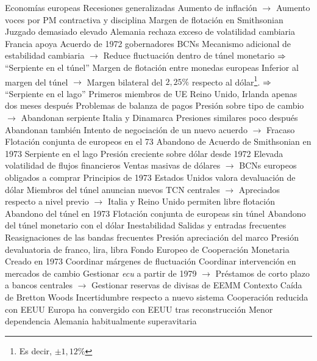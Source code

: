 \documentclass{nuevotema}
\begin{document}
\begin{esquemal}
				\4 Economías europeas
				\4[] Recesiones generalizadas
				\4[] Aumento de inflación
				\4[] $\to$ Aumento voces por PM contractiva y disciplina
				\4 Margen de flotación en Smithsonian
				\4[] Juzgado demasiado elevado
				\4[] Alemania rechaza exceso de volatilidad cambiaria
				\4[] Francia apoya
				\4 Acuerdo de 1972 gobernadores BCNs
				\4[] Mecanismo adicional de estabilidad cambiaria
				\4[] $\to$ Reduce fluctuación dentro de túnel monetario
				\4[] $\then$ ``Serpiente en el túnel''
				\4[] Margen de flotación entre monedas europeas
				\4[] Inferior al margen del túnel
				\4[] $\to$ Margen bilateral del $2,25\%$ respecto al dólar\footnote{Es decir, $\pm 1,12\%$}.
				\4[] $\then$ ``Serpiente en el lago''
				\4[] Primeros miembros de UE
				\4 Reino Unido, Irlanda apenas dos meses después
				\4[] Problemas de balanza de pagos
				\4[] Presión sobre tipo de cambio
				\4[] $\to$ Abandonan serpiente
				\4 Italia y Dinamarca
				\4[] Presiones similares poco después
				\4[] Abandonan también
				\4 Intento de negociación de un nuevo acuerdo
				\4[] $\to$ Fracaso
				\4 Flotación conjunta de europeos en el 73
				\4[$\then$] Abandono de Acuerdo de Smithsonian en 1973
			\3 Serpiente en el lago
				\4 Presión creciente sobre dólar desde 1972
				\4[] Elevada volatilidad de flujos financieros
				\4[] Ventas masivas de dólares
				\4[] $\to$ BCNs europeos obligados a comprar
				\4 Principios de 1973
				\4[] Estados Unidos valora devaluación de dólar
				\4[] Miembros del túnel anuncian nuevos TCN centrales
				\4[] $\to$ Apreciados respecto a nivel previo
				\4[] $\to$ Italia y Reino Unido permiten libre flotación
				\4 Abandono del túnel en 1973
				\4[] Flotación conjunta de europeas sin túnel
				\4[] Abandono del túnel monetario con el dólar
				\4 Inestabilidad
				\4[] Salidas y entradas frecuentes
				\4 Reasignaciones de las bandas frecuentes
				\4[] Presión apreciación del marco
				\4[] Presión devaluatoria de franco, lira, libra
				\4 Fondo Europeo de Cooperación Monetaria
				\4[] Creado en 1973
				\4[] Coordinar márgenes de fluctuación
				\4[] Coordinar intervención en mercados de cambio
				\4[] Gestionar \textit{ecu} a partir de 1979
				\4[] $\to$ Préstamos de corto plazo a bancos centrales
				\4[] $\to$ Gestionar reservas de divisas de EEMM
	\1 
		\2 Contexto
			\3 Caída de Bretton Woods
				\4 Incertidumbre respecto a nuevo sistema
				\4 Cooperación reducida con EEUU
				\4 Europa ha convergido con EEUU tras reconstrucción
				\4[] Menor dependencia
				\4[] Alemania habitualmente superavitaria

\end{esquemal}
\end{document}
